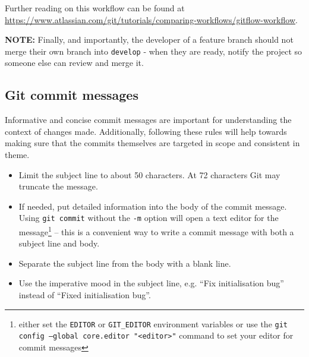 \documentclass[11pt]{article}
\begin{document}
Further reading on this workflow can be found at
\url{https://www.atlassian.com/git/tutorials/comparing-workflows/gitflow-workflow}.

\textbf{NOTE:} Finally, and importantly, the developer of a feature branch should not merge their
own branch into \texttt{develop} - when they are ready, notify the project so someone else can
review and merge it.

\subsection{Git commit messages}
Informative and concise commit messages are important for understanding the context of changes made. 
Additionally, following these rules will help towards making sure that the commits themselves are targeted in scope and consistent in theme. 

\begin{itemize}
    \item Limit the subject line to about 50 characters. At 72 characters Git may truncate the message. 
    \item If needed, put detailed information into the body of the commit message. Using \texttt{git commit} without the \texttt{-m} option will open a text editor for the message\footnote{either set the \texttt{EDITOR} or \texttt{GIT\_EDITOR} environment variables or use the \texttt{git config --global core.editor "<editor>"} command to set your editor for commit messages} -- this is a convenient way to write a commit message with both a subject line and body. 
    \item Separate the subject line from the body with a blank line.
    \item Use the imperative mood in the subject line, e.g. ``Fix initialisation bug'' instead of ``Fixed initialisation bug''.
\end{itemize}
\end{document}
